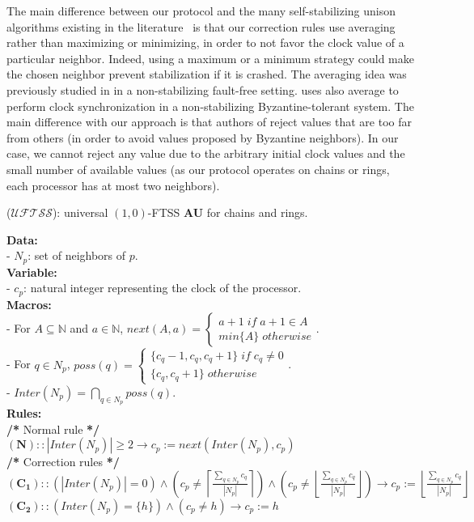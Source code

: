 \documentclass[11pt,english,letterpaper]{article}
\begin{document}
The main difference between our protocol and the many self-stabilizing unison algorithms existing in the literature~\cite{DH07cb,D97j,DW97j,PT97j} is that our correction rules use averaging rather than maximizing or minimizing, in order to not favor the clock value of a particular neighbor. Indeed, using a maximum or a minimum strategy could make the chosen neighbor prevent stabilization if it is crashed. The averaging idea was previously studied in \cite{LR04c} in a non-stabilizing fault-free setting. \cite{LM85j} uses also average to perform clock synchronization in a non-stabilizing Byzantine-tolerant system. The main difference with our approach is that authors of \cite{LM85j} reject values that are too far from others (in order to avoid values proposed by Byzantine neighbors). In our case, we cannot reject any value due to the arbitrary initial clock values and the small number of available values (as our protocol operates on chains or rings, each processor has at most two neighbors).

\begin{algorithm}
\caption{($\mathcal{UFTSS}$): universal $(1,0)$-FTSS \textbf{AU} for chains and rings.}\label{algo:uftss}
\begin{small}		
\textbf{Data:}\\
- $N_{p}$: set of neighbors of $p$.\\
\textbf{Variable:}\\
- $c_{p}$: natural integer representing the clock of the processor.\\
\textbf{Macros:}\\
- For $A\subseteq \mathbb{N}$ and $a\in \mathbb{N}$, $next(A,a)=\begin{cases}
a+1\;if\;a+1\in A\\
min\{A\}\;otherwise\end{cases}$.\\
- For $q\in N_{p}$, $poss(q)=\begin{cases}
\{c_{q}-1,c_{q},c_{q}+1\}\;if\;c_{q}\neq 0\\
\{c_{q},c_{q}+1\}\;otherwise\end{cases}$.\\
- $Inter(N_{p})=\underset{q\in N_{p}}{\bigcap}poss(q)$.\\
\textbf{Rules:}\\
\textbf{/{*}} Normal rule \textbf{{*}/}\\
$\boldsymbol{(N)} :: |Inter(N_{p})|\geq 2\longrightarrow c_{p}:=next\left(Inter(N_{p}),c_{p}\right)$\\
\textbf{/{*}} Correction rules \textbf{{*}/}\\
$\boldsymbol{(C_{1})} :: \left(|Inter(N_{p})|=0\right)\wedge\left(c_{p}\neq \left\lceil \frac{\underset{q\in N_{p}}{\sum}c_{q}}{|N_{p}|}\right\rceil\right)\wedge \left(c_{p}\neq \left\lfloor \frac{\underset{q\in N_{p}}{\sum}c_{q}}{|N_{p}|}\right\rfloor\right)\longrightarrow c_{p}:=\left\lfloor \frac{\underset{q\in N_{p}}{\sum}c_{q}}{|N_{p}|}\right\rfloor$\\
$\boldsymbol{(C_{2})} :: (Inter(N_{p})=\{h\})\wedge(c_{p}\neq h)\longrightarrow c_{p}:=h$
\end{small}		
\end{algorithm}
\end{document}
